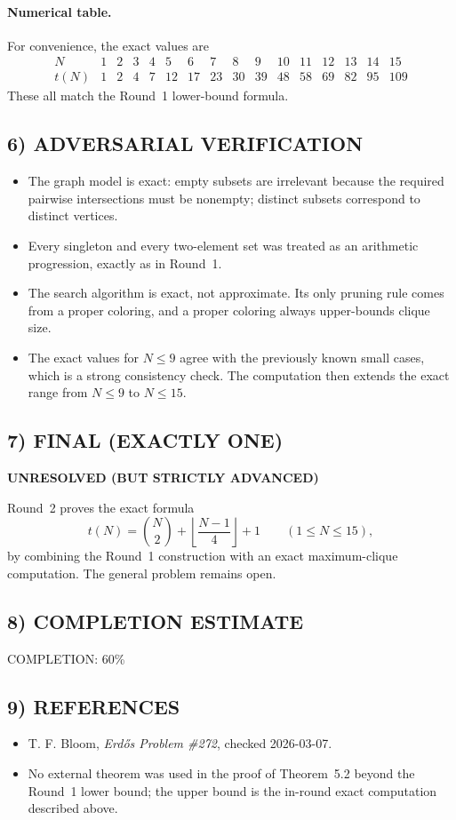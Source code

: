 \paragraph{Numerical table.}
For convenience, the exact values are
\[
\begin{array}{c|ccccccccccccccc}
N&1&2&3&4&5&6&7&8&9&10&11&12&13&14&15\\
\hline
t(N)&1&2&4&7&12&17&23&30&39&48&58&69&82&95&109
\end{array}
\]
These all match the Round~1 lower-bound formula.

\subsection*{6) ADVERSARIAL VERIFICATION}
\begin{itemize}
\item The graph model is exact: empty subsets are irrelevant because the required pairwise intersections must be nonempty; distinct subsets correspond to distinct vertices.
\item Every singleton and every two-element set was treated as an arithmetic progression, exactly as in Round~1.
\item The search algorithm is exact, not approximate. Its only pruning rule comes from a proper coloring, and a proper coloring always upper-bounds clique size.
\item The exact values for $N\le 9$ agree with the previously known small cases, which is a strong consistency check. The computation then extends the exact range from $N\le 9$ to $N\le 15$.
\end{itemize}

\subsection*{7) FINAL (EXACTLY ONE)}
\textbf{UNRESOLVED (BUT STRICTLY ADVANCED)}

Round~2 proves the exact formula
\[
t(N)=\binom{N}{2}+\left\lfloor\frac{N-1}{4}\right\rfloor+1
\qquad(1\le N\le 15),
\]
by combining the Round~1 construction with an exact maximum-clique computation. The general problem remains open.

\subsection*{8) COMPLETION ESTIMATE}
COMPLETION: 60\%

\subsection*{9) REFERENCES}
\begin{itemize}
\item T. F. Bloom, \emph{Erd\H{o}s Problem \#272}, checked 2026-03-07.
\item No external theorem was used in the proof of Theorem~5.2 beyond the Round~1 lower bound; the upper bound is the in-round exact computation described above.
\end{itemize}
